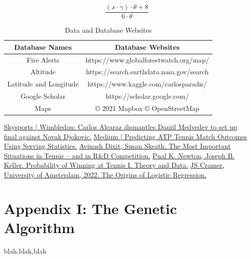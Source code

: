 \documentclass[12pt]{article}  %
\begin{document}
\[ \frac{{(x \cdot \gamma) \cdot \theta + 8}}{{6 \cdot \theta}} \tag{1}\]


\begin{table}[htbp]
	\begin{center}
		\caption{Data and Database Websites}
		\resizebox{\textwidth}{!}
		{\begin{tabular}{c c}
				\toprule[2pt]
				\multicolumn{1}{m{5cm}}{\centering \textbf{Database Names}}
				&\multicolumn{1}{m{10cm}}{\centering \textbf{Database Websites} }\\ %
				\midrule
				Fire Alerts& https://www.globalforestwatch.org/map/ \\
				Altitude & https://search.earthdata.nasa.gov/search \\
				Latitude and Longitude & https://www.kaggle.com/carlosparadis/\\ 
				Google Scholar & https://scholar.google.com/ \\
				Maps& \copyright{} 2021 Mapbox \copyright{} OpenStreetMap\\
				\bottomrule[2pt]
		\end{tabular}}
	\end{center}
\end{table}




\clearpage   
\begin{thebibliography}{99}
     \href{https://www.skysports.com/tennis/news/32498/12920986/wimbledon-carlos-alcaraz-dismantles-daniil-medvedev-to-set-up-final-against-novak-djokovic}{Skysports | Wimbledon: Carlos Alcaraz dismantles Daniil Medvedev to set up final against Novak Djokovic.}
	 \href{https://medium.com/swlh/cde03d99f410}{Medium | Predicting ATP Tennis Match Outcomes Using Serving Statistics.}
	 \href{https://www.princeton.edu/~dixitak/home/Tennis.pdf}{Avinash Dixit, Susan Skeath. The Most Important Situations in Tennis – and in R\&D Competition.}
	 \href{https://www.cis.upenn.edu/~bhusnur4/cit592\_fall2013/NeKe2005.pdf}{Pual K. Newton, Joseph B. Keller. Probability of Winning at Tennis I. Theory and Data.}
	 \href{https://papers.tinbergen.nl/02119.pdf}{JS Cramer, University of Amsterdam, 2022. The Origins of Logistic Regression. }

\end{thebibliography}

\appendix
\section{Appendix I: The Genetic Algorithm}
blah,blah,blah
\end{document}
